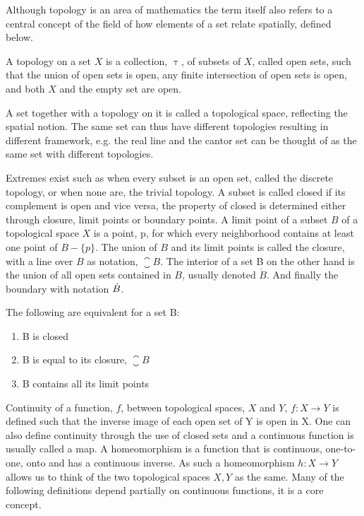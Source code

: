 \documentclass[../../main.tex]{subfiles}
\begin{document}
    Although topology is an area of mathematics the term itself also refers to a central concept of the field of how elements of a set relate spatially, defined below. 

    \begin{definition}
        A topology on a set $X$ is a collection, $\uptau$, of subsets of $X$, called open sets, such that the union of open sets is open, any finite intersection of open sets is open, and both $X$ and the empty set are open. 
    \end{definition}

    A set together with a topology on it is called a topological space, reflecting the spatial notion. The same set can thus have different topologies resulting in different framework, e.g. the real line and the cantor set can be thought of as the same set with different topologies. 
            
    Extremes exist such as when every subset is an open set, called the discrete topology, or when none are, the trivial topology. A subset is called closed if its complement is open and vice versa, the property of closed is determined either through closure, limit points or boundary points. A limit point of a subset $B$ of a topological space $X$ is a point, p, for which every neighborhood contains at least one point of $B - \{p\}$. The union of $B$ and its limit points is called the closure, with a line over $B$ as notation, $\closure{B}$. The interior of a set B on the other hand is the union of all open sets contained in $B$, usually denoted $\mathring{B}$. And finally the boundary with notation $\dot{B}$.
    
    \begin{proposition}
        The following are equivalent for a set B:
        \begin{enumerate}
            \item B is closed
            \item B is equal to its closure, $\closure{B}$
            \item B contains all its limit points
        \end{enumerate}
    \end{proposition}
    
    Continuity of a function, $f$, between topological spaces, $X$ and $Y$, $f:X\to Y$ is defined such that the inverse image of each open set of Y is open in X. One can also define continuity through the use of closed sets and a continuous function is usually called a map. A homeomorphism is a function that is continuous, one-to-one, onto and has a continuous inverse. As such a homeomorphism $h:X\to Y$ allows us to think of the two topological spaces $X, Y$ as the same. Many of the following definitions depend partially on continuous functions, it is a core concept.
    
\end{document}
